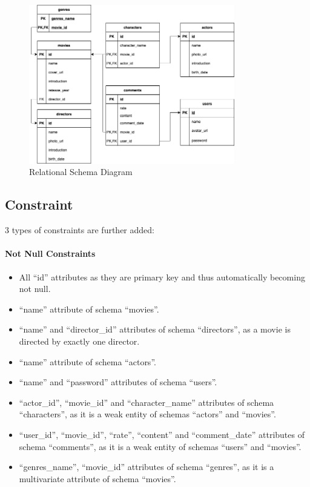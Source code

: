 \begin{CJK*}{UTF8}{gbsn}
\begin{figure}[h]
\centering
\label{RelationalSchema}
\includegraphics[width=0.8\textwidth]{schema.png}
\caption{Relational Schema Diagram}
\end{figure}

\subsection{Constraint}
3 types of constraints are further added:
\paragraph{Not Null Constraints}
\begin{itemize}
\item All ``id'' attributes as they are primary key and thus automatically becoming not null.
\item ``name'' attribute of schema ``movies''.
\item ``name'' and ``director\_id'' attributes of schema ``directors'', as a movie is directed by exactly one director.
\item ``name'' attribute of schema ``actors''.
\item ``name'' and ``password'' attributes of schema ``users''.
\item ``actor\_id'', ``movie\_id'' and ``character\_name'' attributes of schema ``characters'', as it is a weak entity of schemas ``actors'' and ``movies''.
\item ``user\_id'', ``movie\_id'', ``rate'', ``content'' and ``comment\_date'' attributes of schema ``comments'', as it is a weak entity of schemas ``users'' and ``movies''.
\item ``genres\_name'', ``movie\_id'' attributes of schema ``genres'', as it is a multivariate attribute of schema ``movies''.
\end{itemize}

\end{CJK*}
